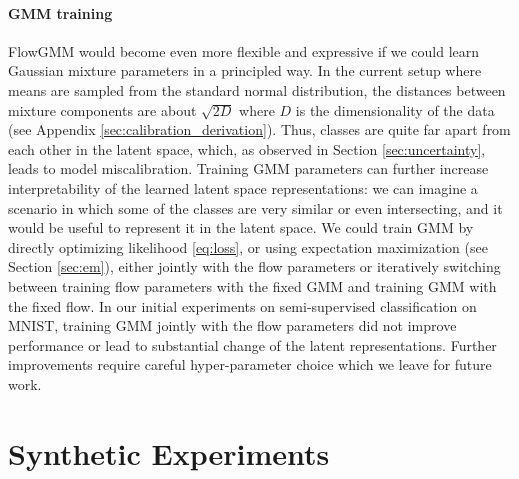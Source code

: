 \documentclass{article}
\begin{document}
\paragraph{GMM training} FlowGMM would become even more flexible and expressive if we could learn Gaussian mixture parameters in a principled way. In the current setup where means are sampled from the standard normal distribution, the distances between mixture components are about $\sqrt{2D}$ where $D$ is the dimensionality of the data (see Appendix \ref{sec:calibration_derivation}). Thus, classes are quite far apart from each other in the latent space, which, as observed in Section \ref{sec:uncertainty}, leads to model miscalibration. Training GMM parameters can further increase interpretability of the learned latent space representations: we can imagine a scenario in which some of the classes are very similar or even intersecting, and it would be useful to represent it in the latent space. We could train GMM by directly optimizing likelihood \eqref{eq:loss}, or using expectation maximization (see Section \ref{sec:em}), either jointly with the flow parameters or iteratively switching between training flow parameters with the fixed GMM and training GMM with the fixed flow. In our initial experiments on semi-supervised classification on MNIST, training GMM jointly with the flow parameters did not improve performance or lead to substantial change of the latent representations. Further improvements require careful hyper-parameter choice which we leave for future work.

\section{Synthetic Experiments}
\label{sec:synthetic}
\end{document}
